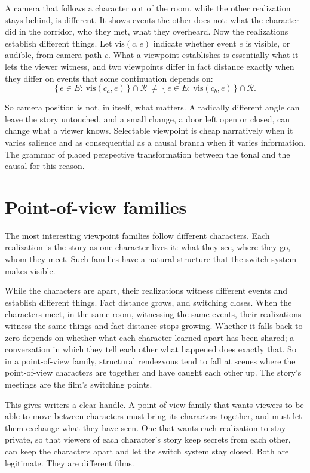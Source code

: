 A camera that follows a character out of the room, while the other realization stays behind, is different. It shows events the other does not: what the character did in the corridor, who they met, what they overheard. Now the realizations establish different things. Let $\mathrm{vis}(c,e)$ indicate whether event $e$ is visible, or audible, from camera path $c$. What a viewpoint establishes is essentially what it lets the viewer witness, and two viewpoints differ in fact distance exactly when they differ on events that some continuation depends on:
\begin{equation}
\{\,e\in E:\ \mathrm{vis}(c_a,e)\,\}\cap\mathcal R\ \neq\ \{\,e\in E:\ \mathrm{vis}(c_b,e)\,\}\cap\mathcal R .
\end{equation}

So camera position is not, in itself, what matters. A radically different angle can leave the story untouched, and a small change, a door left open or closed, can change what a viewer knows. Selectable viewpoint is cheap narratively when it varies salience and as consequential as a causal branch when it varies information. The grammar of  placed perspective transformation between the tonal and the causal for this reason.

\section{Point-of-view families}

The most interesting viewpoint families follow different characters. Each realization is the story as one character lives it: what they see, where they go, whom they meet. Such families have a natural structure that the switch system makes visible.

While the characters are apart, their realizations witness different events and establish different things. Fact distance grows, and switching closes. When the characters meet, in the same room, witnessing the same events, their realizations witness the same things and fact distance stops growing. Whether it falls back to zero depends on whether what each character learned apart has been shared; a conversation in which they tell each other what happened does exactly that. So in a point-of-view family, structural rendezvous tend to fall at scenes where the point-of-view characters are together and have caught each other up. The story's meetings are the film's switching points.

This gives writers a clear handle. A point-of-view family that wants viewers to be able to move between characters must bring its characters together, and must let them exchange what they have seen. One that wants each realization to stay private, so that viewers of each character's story keep secrets from each other, can keep the characters apart and let the switch system stay closed. Both are legitimate. They are different films.

